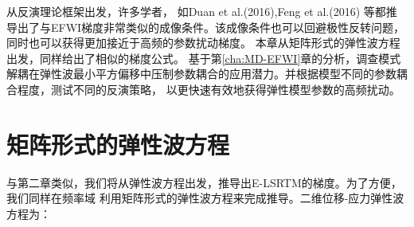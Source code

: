 从反演理论框架出发，许多学者，
如Duan et al.(2016)\cite{Duan2016},Feng et
al.(2016)\cite{Feng2016}
等都推导出了与EFWI梯度非常类似的成像条件。该成像条件也可以回避极性反转问题，同时也可以获得更加接近于高频的参数扰动梯度。
本章从矩阵形式的弹性波方程出发，同样给出了相似的梯度公式。
基于第\ref{cha:MD-EFWI}章的分析，调查模式解耦在弹性波最小平方偏移中压制参数耦合的应用潜力。并根据模型不同的参数耦合程度，测试不同的反演策略，
以更快速有效地获得弹性模型参数的高频扰动。
\clearpage
\section{矩阵形式的弹性波方程}
与第二章类似，我们将从弹性波方程出发，推导出E-LSRTM的梯度。为了方便，我们同样在频率域
利用矩阵形式的弹性波方程来完成推导。二维位移-应力弹性波方程为：

